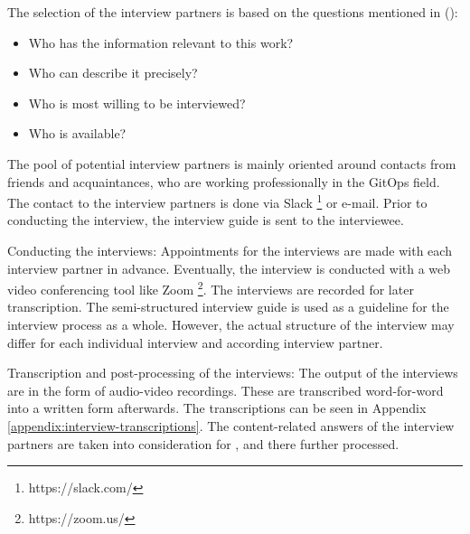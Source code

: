 \newpage

The selection of the interview partners is based on the questions mentioned in
\citeauthor{glaser2010experteninterviews} (\citeyear{glaser2010experteninterviews}):

\begin{itemize}
	\item Who has the information relevant to this work?
	\item Who can describe it precisely?
	\item Who is most willing to be interviewed?
	\item Who is available?
\end{itemize}

The pool of potential interview partners is mainly oriented around
contacts from friends and acquaintances,
who are working professionally in the GitOps field.
The contact to the interview partners is done via Slack
\footnote{https://slack.com/}
or e-mail.
Prior to conducting the interview, the interview guide is sent to the interviewee.

Conducting the interviews:
Appointments for the interviews are made with each interview partner in advance. 
Eventually, the interview is conducted with a web video conferencing tool like Zoom
\footnote{https://zoom.us/}.
The interviews are recorded for later transcription.
The semi-structured interview guide
is used as a guideline for the interview process as a whole.
However, the actual structure of the interview may differ for each individual interview and according interview partner.

Transcription and post-processing of the interviews:
The output of the interviews are in the form of audio-video recordings.
These are transcribed word-for-word into a written form afterwards.
The transcriptions can be seen in Appendix \ref{appendix:interview-transcriptions}.
The content-related answers of the interview partners are taken into consideration
for , and there further processed.




